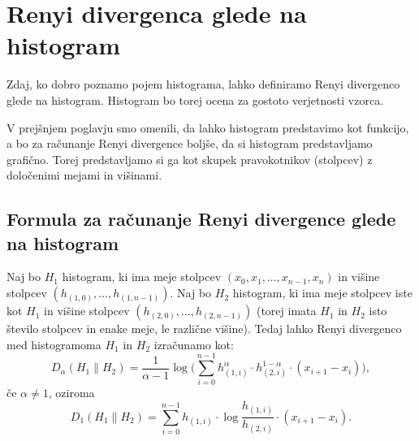 \section{Renyi divergenca glede na histogram}\label{posplositev1d}

Zdaj, ko dobro poznamo pojem histograma, lahko definiramo Renyi divergenco glede na histogram. Histogram bo torej ocena za gostoto verjetnosti vzorca.

V prejšnjem poglavju smo omenili, da lahko histogram predstavimo kot funkcijo, a bo za računanje Renyi divergence boljše, da si histogram predstavljamo grafično. Torej predstavljamo si ga kot skupek pravokotnikov (stolpcev) z določenimi mejami in višinami.

\subsection{Formula za računanje Renyi divergence glede na histogram}

\begin{izrek}
    Naj bo $H_1$ histogram, ki ima meje stolpcev $(x_0,x_1,\ldots,x_{n-1}, x_n)$ in višine stolpcev $(h_{(1,0)},\ldots,h_{(1,n-1)})$. Naj bo $H_2$ histogram, ki ima meje stolpcev iste kot $H_1$ in višine stolpcev $(h_{(2,0)}, \ldots, h_{(2,n-1)})$ (torej imata $H_1$ in $H_2$ isto število stolpcev in enake meje, le različne višine). Tedaj lahko Renyi divergenco med histogramoma $H_1$ in $H_2$ izračunamo kot:
    \begin{equation}
        D_\alpha (H_1 \| H_2) = \frac{1}{\alpha-1} \log\Big(\sum_{i=0}^{n-1} h_{(1,i)}^\alpha \cdot h_{(2,i)}^{1-\alpha} \cdot (x_{i+1}-x_i)\Big),
    \end{equation}
    če $\alpha \neq 1$, oziroma
    \begin{equation}
        D_1 (H_1 \| H_2) = \sum_{i=0}^{n-1} h_{(1,i)}\cdot \log \frac{h_{(1,i)}}{h_{(2,i)}} \cdot (x_{i+1}-x_i).
    \end{equation}
\end{izrek}

